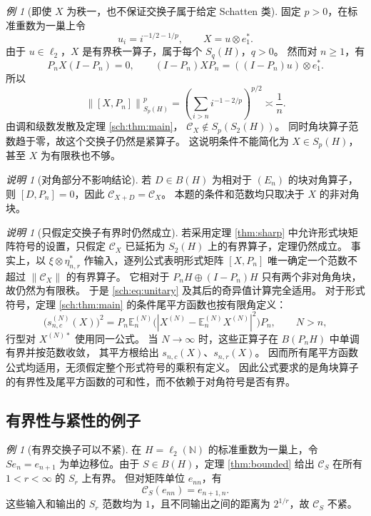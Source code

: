 \documentclass[UTF8,11pt,a4paper,fontset=fandol]{ctexart}
\theoremstyle{remark}
\newtheorem{remark}[theorem]{说明}
\newtheorem{example}[theorem]{例}
\newcommand{\CC}{\mathcal C}
\newcommand{\norm}[1]{\left\lVert #1\right\rVert}
\numberwithin{equation}{section}
\begin{document}
\begin{example}[即使 $X$ 为秩一，也不保证交换子属于给定 Schatten 类]
固定 $p>0$，在标准重数为一巢上令
\[
 u_i=i^{-1/2-1/p},\qquad
 X=u\otimes e_1^*.
\]
由于 $u\in\ell_2$，$X$ 是有界秩一算子，属于每个 $S_q(H)$，$q>0$。
然而对 $n\geq1$，有
\[
 P_nX(I-P_n)=0,\qquad
 (I-P_n)XP_n=((I-P_n)u)\otimes e_1^*.
\]
所以
\[
 \norm{[X,P_n]}_{S_p(H)}^p
 =\left(\sum_{i>n}i^{-1-2/p}\right)^{p/2}
 \asymp\frac1n.
\]
由调和级数发散及定理 \ref{sch:thm:main}，
$\CC_X\notin S_p(S_2(H))$。
同时角块算子范数趋于零，故这个交换子仍然是紧算子。
这说明条件不能简化为 $X\in S_p(H)$，甚至 $X$ 为有限秩也不够。
\end{example}

\begin{remark}[对角部分不影响结论]
若 $D\in B(H)$ 为相对于 $(E_n)$ 的块对角算子，则
$[D,P_n]=0$，因此 $\CC_{X+D}=\CC_X$。
本题的条件和范数均只取决于 $X$ 的非对角块。
\end{remark}

\begin{remark}[只假定交换子有界时仍然成立]
若采用定理 \ref{thm:sharp} 中允许形式块矩阵符号的设置，只假定
$\CC_X$ 已延拓为 $S_2(H)$ 上的有界算子，定理仍然成立。
事实上，以 $\xi\otimes\eta_{n,r}^*$ 作输入，逐列公式表明形式矩阵
$[X,P_n]$ 唯一确定一个范数不超过 $\norm{\CC_X}$ 的有界算子。
它相对于 $P_nH\oplus(I-P_n)H$ 只有两个非对角角块，故仍然为有限秩。
于是 \eqref{sch:eq:unitary} 及其后的奇异值计算完全适用。
对于形式符号，定理 \ref{sch:thm:main} 的条件尾平方函数也按有限角定义：
\[
 \bigl(s_{n,c}^{(N)}(X)\bigr)^2
 =P_n\mathbb E_n^{(N)}\bigl(
   |X^{(N)}-\mathbb E_n^{(N)}X^{(N)}|^2\bigr)P_n,
 \qquad N>n,
\]
行型对 $X^{(N)*}$ 使用同一公式。
当 $N\to\infty$ 时，这些正算子在 $B(P_nH)$ 中单调有界并按范数收敛，
其平方根给出 $s_{n,c}(X)$、$s_{n,r}(X)$。
因而所有尾平方函数公式均适用，无须假定整个形式符号的乘积有定义。
因此公式要求的是角块算子的有界性及尾平方函数的可和性，而不依赖于对角符号是否有界。
\end{remark}

\subsection{有界性与紧性的例子}

\begin{example}[有界交换子可以不紧]
在 $H=\ell_2(\mathbb N)$ 的标准重数为一巢上，令
$Se_n=e_{n+1}$ 为单边移位。由于 $S\in B(H)$，定理 \ref{thm:bounded}
给出 $\CC_S$ 在所有 $1<r<\infty$ 的 $S_r$ 上有界。
但对矩阵单位 $e_{nn}$，有
\[
 \CC_S(e_{nn})=e_{n+1,n}.
\]
这些输入和输出的 $S_r$ 范数均为 $1$，且不同输出之间的距离为
$2^{1/r}$，故 $\CC_S$ 不紧。
\end{example}
\end{document}
